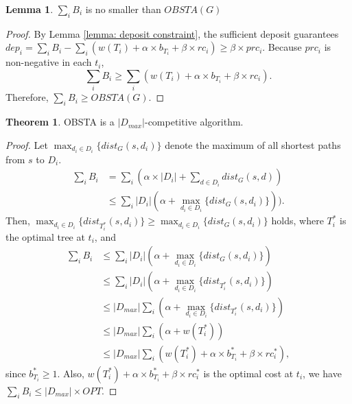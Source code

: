 \documentclass[10pt, conference, letterpaper]{IEEEtran}
\theoremstyle{definition}
\newtheorem{lemma}{Lemma}
\newtheorem{theo}{Theorem}
\begin{document}
\begin{lemma} \label{lemma: budget sum no less OBSTA}
$\sum_{i}{B_{i}}$ is no smaller than $OBSTA(G)$
\end{lemma}
\begin{proof}
By Lemma \ref{lemma: deposit constraint},
the sufficient deposit guarantees 
$dep_{i}=\sum_{i}B_{i}-\sum_{i}(w(T_{i})+\alpha\times b_{T_i}+\beta \times rc_{i})\geq \beta \times prc_i$. Because 
$prc_{i}$ is non-negative in each $t_i$,
$$
\sum_{i}B_{i} \geq \sum_{i}(w(T_{i})+\alpha\times b_{T_i}+\beta \times rc_{i}).
$$
Therefore, $\sum_{i}B_{i} \geq OBSTA(G)$.
\end{proof}
\begin{theo} \label{theo: ratio}
OBSTA is a $|D_{max}|$-competitive algorithm.
\end{theo}
\begin{proof}
Let $\max_{d_i\in D_i} \{dist_{G}(s,d_{i})\}$ denote the maximum of all shortest paths from $s$ to $D_{i}$. %
\begin{align*}
\sum_{i}{B_{i}}&=\sum_{i}(\alpha \times |D_{i}|+\sum_{d\in D_{i}}dist_{G}(s,d))\\
&\leq \sum_{i}|D_{i}|(\alpha+\max_{d_i\in D_i} \{dist_{G}(s,d_{i})\})).
\end{align*}
Then, $\max_{d_i\in D_i} \{dist_{T_{i}^*}(s,d_{i})\}\geq \max_{d_i\in D_i} \{dist_{G}(s,d_{i})\}$ holds, where $T_{i}^*$ is the optimal tree at $t_i$, and 
\begin{align*}
\sum_{i}{B_{i}}&\leq \sum_{i}|D_{i}|(\alpha+\max_{d_i\in D_i} \{dist_{G}(s,d_{i})\})\\
&\leq \sum_{i}|D_{i}|(\alpha+\max_{d_i\in D_i} \{dist_{T_{i}^*}(s,d_{i})\})\\
&\leq |D_{max}|\sum_{i}(\alpha+\max_{d_i\in D_i} \{dist_{T_{i}^*}(s,d_{i})\})\\
&\leq |D_{max}|\sum_{i}(\alpha+w(T_{i}^*))\\
&\leq |D_{max}|\sum_{i}(w(T_{i}^*)+\alpha \times b_{T_i}^*+\beta \times rc_{i}^*),
\end{align*}
since $b_{T_i}^*\geq 1$. Also, $w(T_{i}^*)+\alpha \times b_{T_i}^*+\beta \times rc_{i}^*$ is the optimal cost at $t_i$, we have $\sum_{i}{B_{i}}\leq |D_{max}| \times OPT$.
\end{proof}
\end{document}
